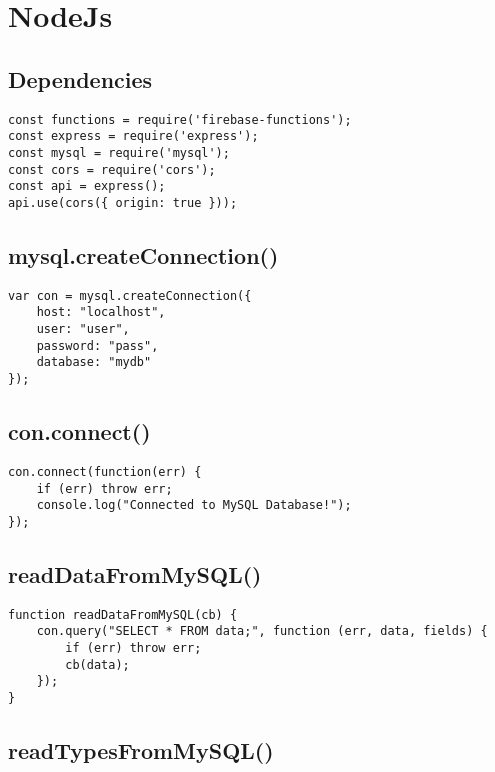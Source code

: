 \documentclass[letterpaper]{article}
\begin{document}
\newpage

\section{NodeJs}\label{NodeJs}

\subsection{Dependencies}

\begin{lstlisting}[firstnumber=1]
const functions = require('firebase-functions');
const express = require('express');
const mysql = require('mysql');
const cors = require('cors');
const api = express();
api.use(cors({ origin: true }));
\end{lstlisting}

\subsection{mysql.createConnection()}

\begin{lstlisting}[firstnumber=8]
var con = mysql.createConnection({
    host: "localhost",
    user: "user",
    password: "pass",
    database: "mydb"
});
\end{lstlisting}

\subsection{con.connect()}

\begin{lstlisting}[firstnumber=15]
con.connect(function(err) {
    if (err) throw err;
    console.log("Connected to MySQL Database!");
});
\end{lstlisting}

\subsection{readDataFromMySQL()}

\begin{lstlisting}[firstnumber=20]
function readDataFromMySQL(cb) {
    con.query("SELECT * FROM data;", function (err, data, fields) {
        if (err) throw err;
        cb(data);
    });
}
\end{lstlisting}

\subsection{readTypesFromMySQL()}
\end{document}
